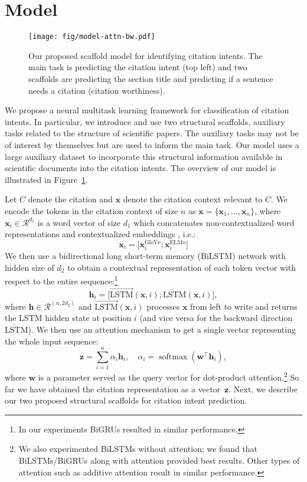 \documentclass[11pt,a4paper]{article}
\newcommand{\V}[1][\mathbf]{#1}
\newcommand{\R}[1]{\mathcal{R}^{#1}}
\newcommand{\Rtwo}[2]{\mathcal{R}^{(#1, #2)}}
\DeclareMathOperator{\softmax}{softmax}
\begin{document}
\section{Model}
\label{sec:model}

\begin{figure}[t]
\centering
\texttt{[image: fig/model-attn-bw.pdf]}
\caption{\small{Our proposed scaffold model for identifying citation intents. The main task is predicting the citation intent (top left) and two scaffolds are predicting the section title and predicting if a sentence needs a citation (citation worthiness).}
}
\label{fig:model}
\end{figure}

We propose a neural multitask learning framework for classification of citation intents. In particular, we introduce and use two structural scaffolds, auxiliary tasks related to the structure of scientific papers.
The auxiliary tasks may not be of interest by themselves but are used to inform the main task. Our model uses a large auxiliary dataset to incorporate this structural information available in scientific documents into the citation intents. The overview of our model is illustrated in Figure~\ref{fig:model}.



Let $C$ denote the citation and $\V{x}$ denote the citation context relevant to $C$.
We encode the tokens in the citation context of size $n$ as $\V{x}=\{\V{x}_1, ..., \V{x}_n\}$, where $\V{x}_i\in\R{d_1}$ is a word vector of size $d_1$ which concatenates non-contextualized word representations \cite[GloVe,][]{pennington2014glove} and contextualized embeddings \cite[ELMo,][]{Peters2018DeepCW}, i.e.:
$$\V{x}_i = \big[\V{x}_i^{\text{GloVe}};\V{x}_i^{\text{ELMo}}\big]$$
We then use a bidirectional long short-term memory \cite{Hochreiter1997LongSM} (BiLSTM) network with hidden size of $d_2$ to obtain a contextual representation of each token vector with respect to the entire sequence:\footnote{In our experiments BiGRUs resulted in similar performance.}
$$ \V{h}_i = \big[\overrightarrow{\mathrm{LSTM}}(\V{x}, i);\overleftarrow{\mathrm{LSTM}}(\V{x}, i)\big],$$
where $ \V{h} \in \Rtwo{n}{2d_2} $ and $\overrightarrow{\mathrm{LSTM}}(\V{x},i)$ processes $\V{x}$ from left to write and returns the LSTM hidden state at position $i$ (and vice versa for the backward direction $\overleftarrow{\mathrm{LSTM}}$).
We then use an attention mechanism to get a single vector representing the whole input sequence:
$$ \V{z} = \sum_{i=1}^n\alpha_i \V{h}_i, \quad \alpha_i = \softmax(\V{w}^\top\V{h}_i),$$
where $\V{w}$ is a parameter served as the query vector for dot-product attention.\footnote{We also experimented BiLSTMs without attention; we found that BiLSTMs/BiGRUs along with attention provided best results. Other types of attention such as additive attention result in similar performance.} So far we have obtained the citation representation as a vector~$\V{z}$. Next, we describe our two proposed structural scaffolds for citation intent prediction.
\end{document}
